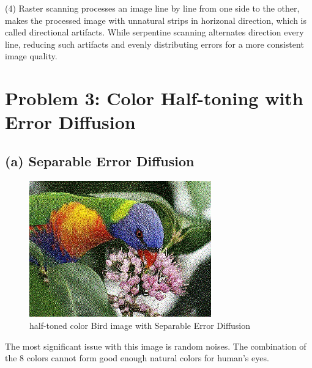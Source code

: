 \documentclass[12pt]{article}
\begin{document}
(4) Raster scanning processes an image line by line from one side to the other, makes the processed image with unnatural strips in horizonal direction, which is called directional artifacts. While serpentine scanning alternates direction every line, reducing such artifacts and evenly distributing errors for a more consistent image quality.

\section*{Problem 3: Color Half-toning with Error Diffusion}
\subsection*{(a) Separable Error Diffusion}
\begin{figure}[H]
	\centering
	\includegraphics[width=0.7\textwidth]{Bird_seperable.jpg}
	\caption{half-toned color Bird image with Separable Error Diffusion}
	\label{fig:Bird_seperable}
\end{figure}
The most significant issue with this image is random noises. The combination of the 8 colors cannot form good enough natural colors for human's eyes.  
\end{document}
